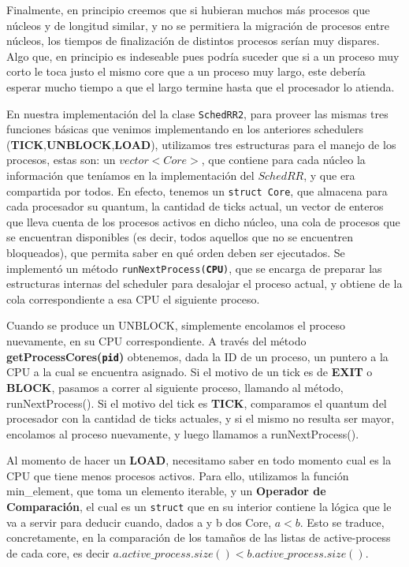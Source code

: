 \documentclass[11pt, a4paper, twoside]{article}
\begin{document}
Finalmente, en principio creemos que si hubieran muchos más procesos que núcleos y de longitud similar, 
y no se permitiera la migración de procesos entre núcleos, los tiempos de finalización de distintos 
procesos serían muy dispares. Algo que, en principio es indeseable pues podría suceder que si a un proceso muy 
corto le toca justo el mismo core que a un proceso muy largo, este debería esperar mucho tiempo a que el largo
termine hasta que el procesador lo atienda. 

En nuestra implementación del la clase \texttt{SchedRR2},
para proveer las mismas tres funciones básicas que venimos
implementando en los anteriores schedulers (\textbf{TICK},\textbf{UNBLOCK},\textbf{LOAD}), 
utilizamos tres estructuras para el manejo de los procesos, estas son: 
un $vector<Core>$, que contiene para cada núcleo la información que teníamos 
en la implementación del $SchedRR$, y que era compartida por todos. En efecto, 
tenemos un \texttt{struct Core}, que almacena para cada procesador su quantum, la cantidad de 
ticks actual, un vector de enteros que lleva cuenta de los procesos activos en dicho núcleo, 
una cola de procesos que se encuentran disponibles (es decir, todos aquellos
que no se encuentren bloqueados), que permita saber en qué orden deben ser ejecutados.
Se implementó un método \texttt{runNextProcess(\textbf{CPU})}, que se encarga de preparar las estructuras
internas del scheduler para desalojar el proceso actual, y obtiene de la cola correspondiente a esa 
CPU el siguiente proceso.

Cuando se produce un UNBLOCK, simplemente encolamos el proceso nuevamente, en su CPU correspondiente. 
A través del método \textbf{getProcessCores(\texttt{pid})} obtenemos, dada la ID de un proceso,
un puntero a la CPU a la cual se encuentra asignado. Si el motivo de un tick es de \textbf{EXIT} 
o \textbf{BLOCK}, pasamos a correr al siguiente proceso, llamando al método, runNextProcess(). Si el
motivo del tick es \textbf{TICK}, comparamos el quantum del procesador con la cantidad de ticks actuales,
y si el mismo no resulta ser mayor, encolamos al proceso nuevamente, y luego llamamos a runNextProcess().

Al momento de hacer un \textbf{LOAD}, necesitamo saber en todo momento cual es la CPU que tiene menos
procesos activos. Para ello, utilizamos la función min\_element, que toma un elemento iterable, y un
\textbf{Operador de Comparación}, el cual es un \texttt{struct} que en su interior contiene la lógica
que le va a servir para deducir cuando, dados a y b dos Core, $a < b$. Esto se traduce, concretamente,
en la comparación de los tamaños de las listas de active-process de cada core, es decir 
$a.active\_process.size() < b.active\_process.size()$.
\end{document}

